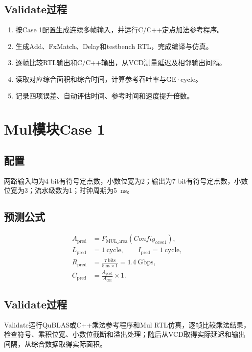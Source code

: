 \documentclass[a4paper,oneside,11pt]{ctexrep}
\begin{document}
\subsection{Validate过程}

\begin{enumerate}
    \item 按Case 1配置生成连续多帧输入，并运行C/C++定点加法参考程序。
    \item 生成Add、FxMatch、Delay和testbench RTL，完成编译与仿真。
    \item 逐帧比较RTL输出和C/C++输出，从VCD测量延迟及相邻输出间隔。
    \item 读取对应综合面积和综合时间，计算参考吞吐率与$\mathrm{GE\cdot cycle}$。
    \item 记录四项误差、自动评估时间、参考时间和速度提升倍数。
\end{enumerate}

\section{Mul模块Case 1}

\subsection{配置}

两路输入均为4 bit有符号定点数，小数位宽为2；输出为7 bit有符号定点数，小数位宽为3；流水级数为1；时钟周期为\SI{5}{\nano\second}。

\subsection{预测公式}

\begin{align}
    A_{\mathrm{pred}} &= F_{\mathrm{MUL\_area}}(Config_{case1}),\\
    L_{\mathrm{pred}} &= 1\ \mathrm{cycle},\qquad I_{\mathrm{pred}}=1\ \mathrm{cycle},\\
    R_{\mathrm{pred}} &= \frac{7\ \mathrm{bits}}{5\ \mathrm{ns}\times1}=1.4\ \mathrm{Gbps},\\
    C_{\mathrm{pred}} &= \frac{A_{\mathrm{pred}}}{A_{\mathrm{GE}}}\times1.
\end{align}

\subsection{Validate过程}

Validate运行QuBLAS或C++乘法参考程序和Mul RTL仿真，逐帧比较乘法结果，检查符号、乘积位宽、小数位截断和溢出处理；随后从VCD取得实际延迟和输出间隔，从综合数据取得实际面积。
\end{document}
